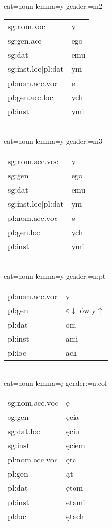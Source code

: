 \documentclass{article}
\begin{document}
\begin{multicols}{2}
cat=noun lemma=y gender:=m2\\
\begin{tabular}{l|l}
sg:nom.voc & y\\
sg:gen.acc & ego\\
sg:dat & emu\\
sg:inst.loc|pl:dat & ym\\
pl:nom.acc.voc & e\\
pl:gen.acc.loc & ych\\
pl:inst & ymi\\
\end{tabular}\\

cat=noun lemma=y gender:=m3\\
\begin{tabular}{l|l}
sg:nom.acc.voc & y\\
sg:gen & ego\\
sg:dat & emu\\
sg:inst.loc|pl:dat & ym\\
pl:nom.acc.voc & e\\
pl:gen.loc & ych\\
pl:inst & ymi\\
\end{tabular}\\

cat=noun lemma=y gender:=n:pt\\
\begin{tabular}{l|l}
pl:nom.acc.voc & y\\
pl:gen & $\varepsilon\downarrow$ ów y$\uparrow$\\
pl:dat & om\\
pl:inst & ami\\
pl:loc & ach\\
\end{tabular}\\

cat=noun lemma=ę gender:=n:col\\
\begin{tabular}{l|l}
sg:nom.acc.voc & ę\\
sg:gen & ęcia\\
sg:dat.loc & ęciu\\
sg:inst & ęciem\\
pl:nom.acc.voc & ęta\\
pl:gen & ąt\\
pl:dat & ętom\\
pl:inst & ętami\\
pl:loc & ętach\\
\end{tabular}\\


\end{multicols}
\end{document}

